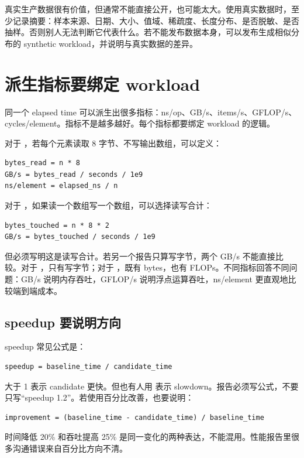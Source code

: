 真实生产数据很有价值，但通常不能直接公开，也可能太大。使用真实数据时，至少记录摘要：样本来源、日期、大小、值域、稀疏度、长度分布、是否脱敏、是否抽样。否则别人无法判断它代表什么。若不能发布数据本身，可以发布生成相似分布的 synthetic workload，并说明与真实数据的差异。

\section{派生指标要绑定 workload}

同一个 elapsed time 可以派生出很多指标：ns/op、GB/s、items/s、GFLOP/s、cycles/element。指标不是越多越好。每个指标都要绑定 workload 的逻辑。

对于 ，若每个元素读取 8 字节、不写输出数组，可以定义：

\begin{lstlisting}
bytes_read = n * 8
GB/s = bytes_read / seconds / 1e9
ns/element = elapsed_ns / n
\end{lstlisting}

对于 ，如果读一个数组写一个数组，可以选择读写合计：

\begin{lstlisting}
bytes_touched = n * 8 * 2
GB/s = bytes_touched / seconds / 1e9
\end{lstlisting}

但必须写明这是读写合计。若另一个报告只算写字节，两个 GB/s 不能直接比较。对于 ，只有写字节；对于 ，既有 bytes，也有 FLOPs。不同指标回答不同问题：GB/s 说明内存吞吐，GFLOP/s 说明浮点运算吞吐，ns/element 更直观地比较端到端成本。

\subsection{speedup 要说明方向}

speedup 常见公式是：

\begin{lstlisting}
speedup = baseline_time / candidate_time
\end{lstlisting}

大于 1 表示 candidate 更快。但也有人用  表示 slowdown。报告必须写公式，不要只写“speedup 1.2”。若使用百分比改善，也要说明：

\begin{lstlisting}
improvement = (baseline_time - candidate_time) / baseline_time
\end{lstlisting}

时间降低 20\% 和吞吐提高 25\% 是同一变化的两种表达，不能混用。性能报告里很多沟通错误来自百分比方向不清。

